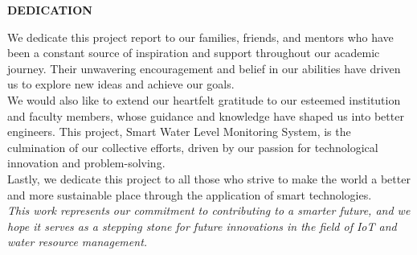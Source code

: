 \vspace*{0.6cm}
\begin{center}
    \fontsize{16}{19}\selectfont
    \textbf{DEDICATION}\\[0.5cm]
\end{center}

\vspace{1cm}
{
\fontsize{12}{14}\selectfont
\noindent
We dedicate this project report to our families, friends, and mentors who have been a constant source of inspiration and support throughout our academic journey. Their unwavering encouragement and belief in our abilities have driven us to explore new ideas and achieve our goals.\\ 

\noindent
We would also like to extend our heartfelt gratitude to our esteemed institution and faculty members, whose guidance and knowledge have shaped us into better engineers. This project, Smart Water Level Monitoring System, is the culmination of our collective efforts, driven by our passion for technological innovation and problem-solving.\\

\noindent
Lastly, we dedicate this project to all those who strive to make the world a better and more sustainable place through the application of smart technologies.\\

\noindent
\textit{This work represents our commitment to contributing to a smarter future, and we hope it serves as a stepping stone for future innovations in the field of IoT and water resource management.}
}
